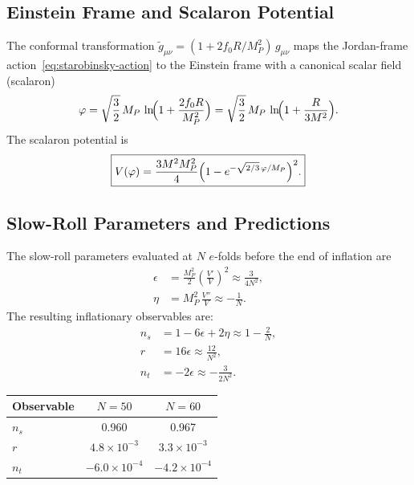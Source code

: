 \documentclass[11pt,a4paper]{article}
\theoremstyle{plain}
\theoremstyle{definition}
\begin{document}
\subsection{Einstein Frame and Scalaron Potential}

The conformal transformation
$\tilde{g}_{\mu\nu} = (1 + 2f_0 R/M_P^2)\,g_{\mu\nu}$ maps the
Jordan-frame action~\eqref{eq:starobinsky-action} to the Einstein frame
with a canonical scalar field (scalaron)
\begin{equation}\label{eq:scalaron}
  \varphi = \sqrt{\frac{3}{2}}\,M_P\,
  \ln\!\Bigl(1 + \frac{2f_0 R}{M_P^2}\Bigr)
  = \sqrt{\frac{3}{2}}\,M_P\,
  \ln\!\Bigl(1 + \frac{R}{3M^2}\Bigr).
\end{equation}
The scalaron potential is~\cite{Star80,Mukhanov81}
\begin{equation}\label{eq:V-starobinsky}
  \boxed{
  V(\varphi) = \frac{3M^2M_P^2}{4}
  \Bigl(1 - e^{-\sqrt{2/3}\,\varphi/M_P}\Bigr)^2.
  }
\end{equation}

\subsection{Slow-Roll Parameters and Predictions}

The slow-roll parameters evaluated at $N$ $e$-folds before the end of
inflation are~\cite{Star80,Mukhanov81,DeFelice10}
\begin{align}
  \epsilon &= \frac{M_P^2}{2}\left(\frac{V'}{V}\right)^2
  \approx \frac{3}{4N^2}, \label{eq:epsilon}\\
  \eta &= M_P^2\,\frac{V''}{V}
  \approx -\frac{1}{N}. \label{eq:eta}
\end{align}
The resulting inflationary observables are:
\begin{align}
  n_s &= 1 - 6\epsilon + 2\eta \approx 1 - \frac{2}{N},
  \label{eq:ns-star}\\
  r &= 16\epsilon \approx \frac{12}{N^2},
  \label{eq:r-star}\\
  n_t &= -2\epsilon \approx -\frac{3}{2N^2}.
  \label{eq:nt-star}
\end{align}

\begin{center}
\renewcommand{\arraystretch}{1.3}
\begin{tabular}{lcc}
\toprule
Observable & $N = 50$ & $N = 60$ \\
\midrule
$n_s$ & 0.960 & 0.967 \\
$r$ & $4.8 \times 10^{-3}$ & $3.3 \times 10^{-3}$ \\
$n_t$ & $-6.0 \times 10^{-4}$ & $-4.2 \times 10^{-4}$ \\
\bottomrule
\end{tabular}
\end{center}
\end{document}
